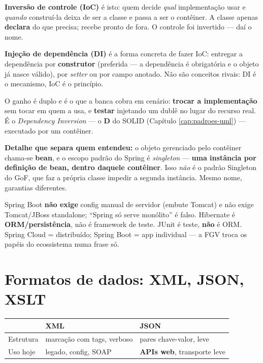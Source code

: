 \begin{conceito}
\textbf{Inversão de controle (IoC)} é isto: quem decide \emph{qual}
implementação usar e \emph{quando} construí-la deixa de ser a classe e passa a
ser o contêiner. A classe apenas \textbf{declara} do que precisa; recebe pronto
de fora. O controle foi invertido --- daí o nome.

\textbf{Injeção de dependência (DI)} é a forma concreta de fazer IoC: entregar
a dependência por \textbf{construtor} (preferida --- a dependência é
obrigatória e o objeto já nasce válido), por \emph{setter} ou por campo
anotado. Não são conceitos rivais: DI é o mecanismo, IoC é o princípio.

O ganho é duplo e é o que a banca cobra em cenário: \textbf{trocar a
implementação} sem tocar em quem a usa, e \textbf{testar} injetando um dublê no
lugar do recurso real. É o \emph{Dependency Inversion} --- o \textbf{D} do
SOLID (Capítulo \ref{cap:padroes-uml}) --- executado por um contêiner.

\textbf{Detalhe que separa quem entendeu:} o objeto gerenciado pelo contêiner
chama-se \textbf{bean}, e o escopo padrão do Spring é \emph{singleton} ---
\textbf{uma instância por definição de bean, dentro daquele contêiner}. Isso
\emph{não} é o padrão Singleton do GoF, que faz a própria classe impedir a
segunda instância. Mesmo nome, garantias diferentes.
\end{conceito}

\begin{pegadinha}
Spring Boot \textbf{não exige} config manual de servidor (embute Tomcat) e
não exige Tomcat/JBoss standalone; ``Spring só serve monólito'' é falso.
Hibernate é \textbf{ORM/persistência}, não é framework de teste. JUnit é
teste, \textbf{não} é ORM. Spring Cloud = distribuído; Spring Boot = app
individual --- a FGV troca os papéis do ecossistema numa frase só.
\end{pegadinha}

\section{Formatos de dados: XML, JSON, XSLT}

\begin{center}
\begin{tabular}{@{}p{2.6cm}p{4.6cm}p{4.6cm}@{}}
\toprule
& \textbf{XML} & \textbf{JSON} \\
\midrule
Estrutura & marcação com tags, verboso & pares chave-valor, leve \\
Uso hoje & legado, config, SOAP & \textbf{APIs web}, transporte leve \\
\bottomrule
\end{tabular}
\end{center}

